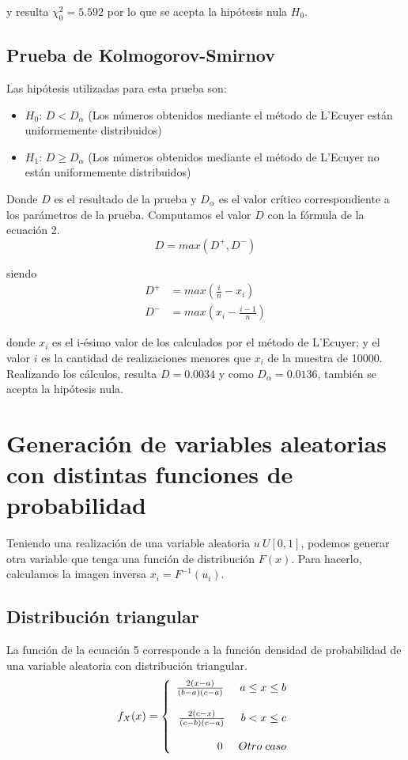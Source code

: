 \documentclass[10pt,journal,compsoc]{IEEEtran}
\begin{document}
y resulta $\chi_{0}^{2} = 5.592$ por lo que se acepta la hip\'otesis nula $H_0$.

\subsection{Prueba de Kolmogorov-Smirnov}
Las hip\'otesis utilizadas para esta prueba son:
\begin{itemize}
 \item {$H_{0}$:} $D < D_{\alpha}$ (Los n\'umeros obtenidos mediante el m\'etodo de L'Ecuyer est\'an uniformemente distribuidos)
 \item {$H_{1}$:} $D \ge D_{\alpha}$ (Los n\'umeros obtenidos mediante el m\'etodo de L'Ecuyer no est\'an uniformemente distribuidos)
\end{itemize}
Donde $D$ es el resultado de la prueba y $D_{\alpha}$ es el valor cr\'itico correspondiente a los par\'ametros de la prueba.
Computamos el valor $D$ con la f\'ormula de la ecuaci\'on 2.
\begin{equation}
 D = max(D^{+}, D^{-})
\end{equation}

siendo
\begin{align}
 D^{+} &= max(\frac{i}{n}-x_i)\\
 D^{-} &= max(x_i - \frac{i-1}{n})
\end{align}

donde $x_i$ es el i-\'esimo valor de los calculados por el m\'etodo de L'Ecuyer; 
y el valor $i$ es la cantidad de realizaciones menores que $x_i$ de la muestra de 10000.
Realizando los c\'alculos, resulta $D = 0.0034$ y como $D_{\alpha} = 0.0136$,
tambi\'en se acepta la hip\'otesis nula.

\section{Generaci\'on de variables aleatorias con distintas funciones de probabilidad}
Teniendo una realizaci\'on de una variable aleatoria $u ~ U[0,1]$, podemos generar otra variable que tenga
una funci\'on de distribuci\'on $F(x)$. Para hacerlo, calculamos la imagen inversa $x_i = F^{-1}(u_i)$.

\subsection{Distribuci\'on triangular}
La funci\'on de la ecuaci\'on 5 corresponde a la funci\'on densidad de probabilidad de una variable aleatoria con distribuci\'on triangular.
\begin{equation}
   f_{X}(x) = \left\{
  \begin{array}{rl}
	\frac{2(x-a)}{(b-a)(c-a)} \hspace{0.5cm} a \le x \le b\\\\
	\frac{2(c-x)}{(c-b)(c-a)} \hspace{0.5cm} b < x \le c\\\\
	0 \hspace{0.5 cm} Otro \hspace{0.1cm} caso
  \end{array} \right.
\end{equation}
\end{document}
